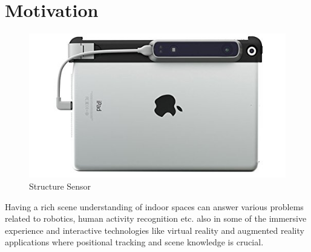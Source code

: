 \section{Motivation}
\begin{figure}[!b]
    \centering
    \includegraphics[width = 12cm]{Figures/ipad.jpg}
    \caption{Structure Sensor}
    \label{fig:Structural_Sensor}
\end{figure}{}

Having a rich scene understanding of indoor spaces can answer various problems related to robotics, human activity recognition etc. also in some of the immersive experience and interactive technologies like  virtual reality and augmented reality applications where positional tracking and scene knowledge is crucial.

